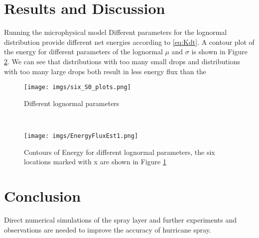 \documentclass[10pt,a4paper]{article}
\begin{document}
\section{Results and Discussion}
Running the microphysical model
Different parameters for the lognormal distribution provide different net energies according to \ref{eq:Kdt}. A contour plot of the energy for different parameters of the lognormal $\mu$ and $\sigma$ is shown in Figure \ref{Fig:EContour}. We can see that distributions with too many small drops and distributions with too many large drops both result in less energy flux than the 
\begin{figure}[h]
\texttt{[image: imgs/six\_S0\_plots.png]}
\caption{Different lognormal parameters\label{Fig:ExSlopes}}
\end{figure}\\
\begin{figure}[h]
\centering
\texttt{[image: imgs/EnergyFluxEst1.png]}
\caption{Contours of Energy for different lognormal parameters, the six locations marked with {\color{red}x} are shown in Figure \ref{Fig:ExSlopes}\label{Fig:EContour}}
\end{figure}


\section{Conclusion}


Direct numerical simulations of the spray layer and further experiments and observations are needed to improve the accuracy of hurricane spray. 





\end{document}
